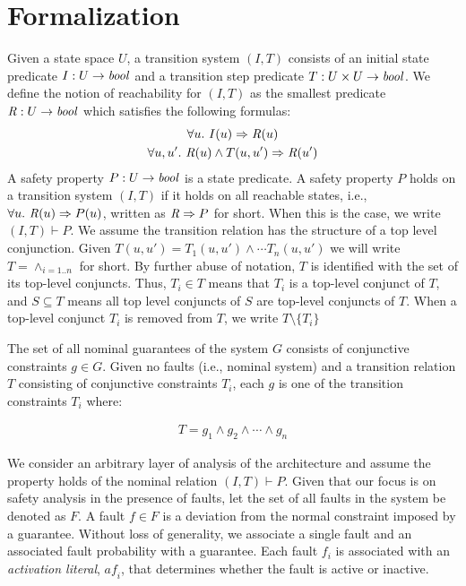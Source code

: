 \section{Formalization}
\label{sec:formalization}
Given a state space $U$, a transition system $(I,T)$ consists of an
initial state predicate $I : U \to \mathit{bool}$ and a transition step
predicate $T : U \times U \to \mathit{bool}$.
We define the notion of
reachability for $(I, T)$ as the smallest predicate $\mathit{R} : U \to
\mathit{bool}$ which satisfies the following formulas:
\begin{gather*}
  \forall u.~ I(u) \Rightarrow \mathit{R}(u) \\
  \forall u, u'.~ \mathit{R}(u) \land T(u, u') \Rightarrow \mathit{R}(u')
\end{gather*}
A safety property $P : U \to \mathit{bool}$ is a state predicate. A safety
property $P$ holds on a transition system $(I, T)$ if it holds on all
reachable states, i.e., $\forall u.~ \mathit{R}(u) \Rightarrow P(u)$,
written as $\mathit{R} \Rightarrow P$ for short. When this is the case, we
write $(I, T)\vdash P$. We assume the transition relation has the structure of a top level conjunction. Given $T(u, u') = T_1(u,u') \land \cdots T_n(u,u')$ we will write $T = \land_{i=1..n}$ for short. By further abuse of notation, $T$ is identified with the set of its top-level conjuncts. Thus, $T_i \in T$ means that $T_i$ is a top-level conjunct of $T$, and $S\subseteq T$ means all top level conjuncts of $S$ are top-level conjuncts of $T$. When a top-level conjunct $T_i$ is removed from $T$, we write $T \setminus \{T_i\}$

The set of all nominal guarantees of the system $G$ consists of conjunctive constraints $g \in G$. Given no faults (i.e., nominal system) and a transition relation $T$ consisting of conjunctive constraints $T_i$, each $g$ is one of the transition constraints $T_i$ where:

\begin{gather}
T = g_1 \land  g_2 \land \cdots \land g_n
\label{eq:Tn}
\end{gather}

We consider an arbitrary layer of analysis of the architecture and assume the property holds of the nominal relation $(I,T) \vdash P$. Given that our focus is on safety analysis in the presence of faults, let the set of all faults in the system be  denoted as $F$. A fault $f \in F$ is a deviation from the normal constraint imposed by a guarantee. Without loss of generality, we associate a single fault and an associated fault probability with a guarantee. Each fault $f_i$ is associated with an \emph{activation literal}, $\mathit{af}_i$, that determines whether the fault is active or inactive. 

